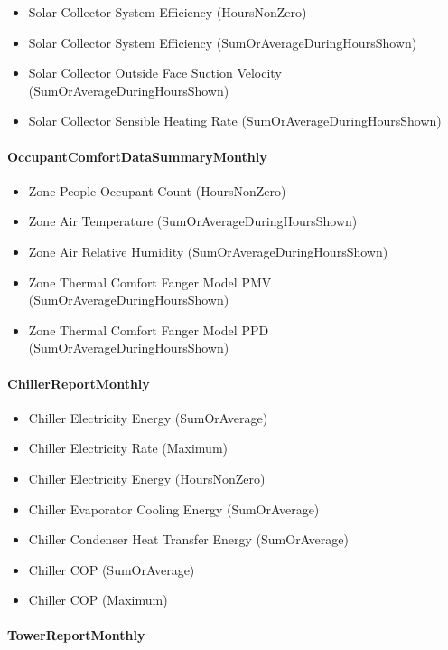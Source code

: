 \begin{itemize}
\item
  Solar Collector System Efficiency (HoursNonZero)
\item
  Solar Collector System Efficiency (SumOrAverageDuringHoursShown)
\item
  Solar Collector Outside Face Suction Velocity (SumOrAverageDuringHoursShown)
\item
  Solar Collector Sensible Heating Rate (SumOrAverageDuringHoursShown)
\end{itemize}

\paragraph{OccupantComfortDataSummaryMonthly}\label{occupantcomfortdatasummarymonthly}

\begin{itemize}
\item
  Zone People Occupant Count (HoursNonZero)
\item
  Zone Air Temperature (SumOrAverageDuringHoursShown)
\item
  Zone Air Relative Humidity (SumOrAverageDuringHoursShown)
\item
  Zone Thermal Comfort Fanger Model PMV (SumOrAverageDuringHoursShown)
\item
  Zone Thermal Comfort Fanger Model PPD (SumOrAverageDuringHoursShown)
\end{itemize}

\paragraph{ChillerReportMonthly}\label{chillerreportmonthly}

\begin{itemize}
\item
  Chiller Electricity Energy (SumOrAverage)
\item
  Chiller Electricity Rate (Maximum)
\item
  Chiller Electricity Energy (HoursNonZero)
\item
  Chiller Evaporator Cooling Energy (SumOrAverage)
\item
  Chiller Condenser Heat Transfer Energy (SumOrAverage)
\item
  Chiller COP (SumOrAverage)
\item
  Chiller COP (Maximum)
\end{itemize}

\paragraph{TowerReportMonthly}\label{towerreportmonthly}

